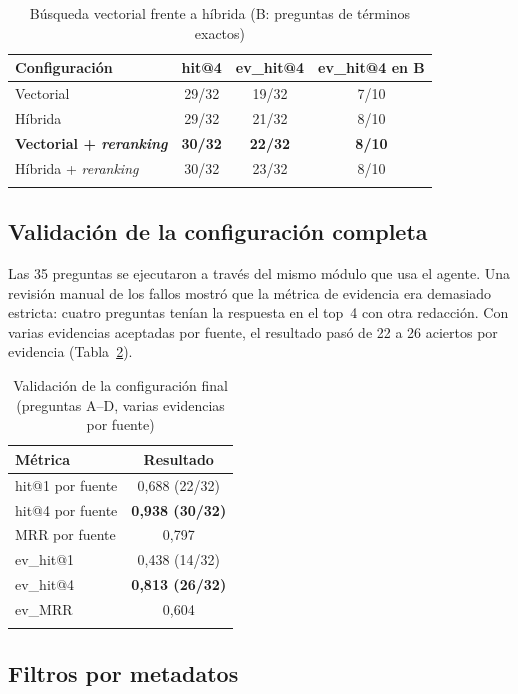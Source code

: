 \documentclass[pdflatex,sn-mathphys-num]{sn-jnl}
\begin{document}
\begin{table}[h]
\caption{Búsqueda vectorial frente a híbrida (B: preguntas de términos exactos)}\label{tab:hibrida}
\begin{tabular}{@{}lccc@{}}
\toprule
Configuración & hit@4 & ev\_hit@4 & ev\_hit@4 en B \\
\midrule
Vectorial & 29/32 & 19/32 & 7/10 \\
Híbrida & 29/32 & 21/32 & 8/10 \\
\textbf{Vectorial + \emph{reranking}} & \textbf{30/32} & \textbf{22/32} & \textbf{8/10} \\
Híbrida + \emph{reranking} & 30/32 & 23/32 & 8/10 \\
\botrule
\end{tabular}
\end{table}

\subsection{Validación de la configuración completa}\label{sec:res-validacion}

Las 35 preguntas se ejecutaron a través del mismo módulo que usa el agente. Una revisión manual de los fallos mostró que la métrica de evidencia era demasiado estricta: cuatro preguntas tenían la respuesta en el top~4 con otra redacción. Con varias evidencias aceptadas por fuente, el resultado pasó de 22 a 26 aciertos por evidencia (Tabla~\ref{tab:validacion}).

\begin{table}[h]
\caption{Validación de la configuración final (preguntas A--D, varias evidencias por fuente)}\label{tab:validacion}
\begin{tabular}{@{}lc@{}}
\toprule
Métrica & Resultado \\
\midrule
hit@1 por fuente & 0,688 (22/32) \\
hit@4 por fuente & \textbf{0,938 (30/32)} \\
MRR por fuente & 0,797 \\
ev\_hit@1 & 0,438 (14/32) \\
ev\_hit@4 & \textbf{0,813 (26/32)} \\
ev\_MRR & 0,604 \\
\botrule
\end{tabular}
\end{table}

\subsection{Filtros por metadatos}\label{sec:res-metadatos}
\end{document}
